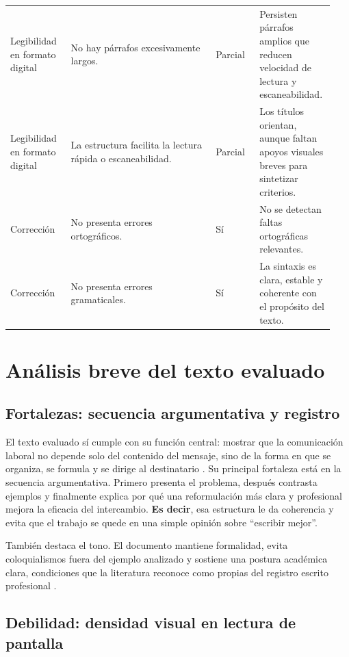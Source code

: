 \documentclass[
	spanish,
	letterpaper, oneside
]{article}
\begin{document}
\begin{longtable}{@{}L{0.18\linewidth}L{0.43\linewidth}L{0.13\linewidth}L{0.20\linewidth}@{}}
Legibilidad en formato digital & No hay párrafos excesivamente largos. & Parcial & Persisten párrafos amplios que reducen velocidad de lectura y escaneabilidad. \\
\addlinespace
Legibilidad en formato digital & La estructura facilita la lectura rápida o escaneabilidad. & Parcial & Los títulos orientan, aunque faltan apoyos visuales breves para sintetizar criterios. \\
\addlinespace
Corrección & No presenta errores ortográficos. & Sí & No se detectan faltas ortográficas relevantes. \\
\addlinespace
Corrección & No presenta errores gramaticales. & Sí & La sintaxis es clara, estable y coherente con el propósito del texto. \\
\bottomrule
\end{longtable}
\endgroup

\section{Análisis breve del texto evaluado}

\subsection{Fortalezas: secuencia argumentativa y registro}

El texto evaluado sí cumple con su función central: mostrar que la comunicación laboral no depende solo del contenido del mensaje, sino de la forma en que se organiza, se formula y se dirige al destinatario \citep{nunezcortesEscrituraAcademicaTeoria2015}. Su principal fortaleza está en la secuencia argumentativa. Primero presenta el problema, después contrasta ejemplos y finalmente explica por qué una reformulación más clara y profesional mejora la eficacia del intercambio. \textbf{Es decir}, esa estructura le da coherencia y evita que el trabajo se quede en una simple opinión sobre ``escribir mejor''.

También destaca el tono. El documento mantiene formalidad, evita coloquialismos fuera del ejemplo analizado y sostiene una postura académica clara, condiciones que la literatura reconoce como propias del registro escrito profesional \citep{correaManualBasicoEscritura2018}.

\subsection{Debilidad: densidad visual en lectura de pantalla}
\end{document}
